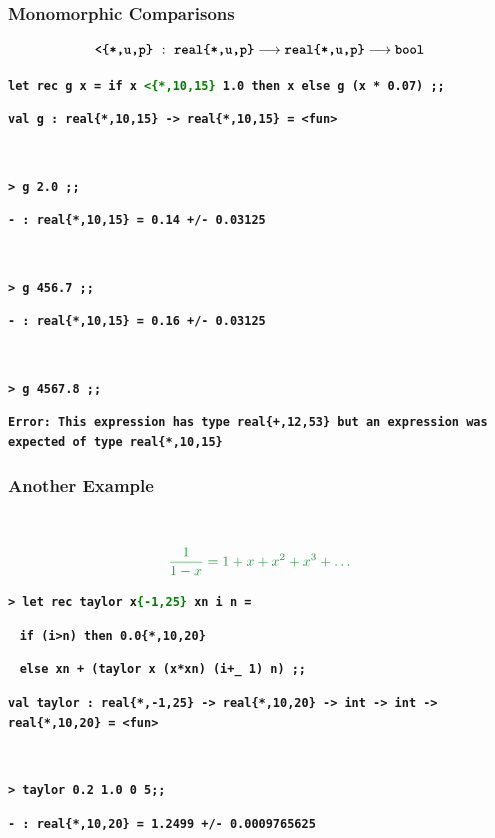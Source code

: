 \documentclass[handout,t]{beamer}
\def\mytt#1{\texttt{\textbf{#1}}}
\def\real#1{real\{#1\}}
\begin{document}
\begin{frame}
\frametitle{Monomorphic Comparisons}


\vspace{0.6cm}

$$
\mytt{<\{*,u,p\}}\ :\ \mytt{\real{*,u,p}} \longrightarrow \mytt{\real{*,u,p}} \longrightarrow 
\mytt{bool}
$$

\vspace{0.6cm}
\scriptsize
\color{blue}


\mytt{let rec g x = if x \textcolor{green}{<\{*,10,15\}} 1.0 then x else g (x * 0.07) ;;}


\mytt{\color{red}val g : \real{*,10,15} -> \real{*,10,15} = <fun>}

\mytt{\ }

\mytt{> g 2.0 ;;}

\mytt{\color{red}- : \real{*,10,15} = 0.14 +/- 0.03125}

\mytt{\ }

\mytt{> g 456.7 ;;}

\mytt{\color{red}- : \real{*,10,15} = 0.16 +/- 0.03125}

\mytt{\ }

\mytt{> g 4567.8 ;;}

\mytt{\color{red}Error: This expression has type \real{+,12,53} but an expression was expected of type \real{*,10,15}
}


\end{frame}
\begin{frame}
\frametitle{Another Example}

~

\vspace{0.5cm}

$$\color{green}
\frac{1}{1-x}=1+x+x^2+x^3+\ldots
$$


\vspace{0.5cm}

\scriptsize
\color{blue}



\mytt{> let rec taylor x\textcolor{green}{\{-1,25\}} xn i n =}

~ \hspace{1.55cm}\mytt{if (i>n) then 0.0\{*,10,20\} }

~ \hspace{1.55cm}\mytt{else xn + (taylor x (x*xn) (i+\_ 1) n) ;;}
 
\mytt{\color{red}val taylor : \real{*,-1,25} -> \real{*,10,20} -> int -> int -> \real{*,10,20} = <fun>
}

\mytt{\ }

\mytt{> taylor 0.2 1.0 0 5;;}

\mytt{\color{red}- : \real{*,10,20} = 1.2499 +/- 0.0009765625}

\mytt{\ }



\end{frame}
\end{document}
